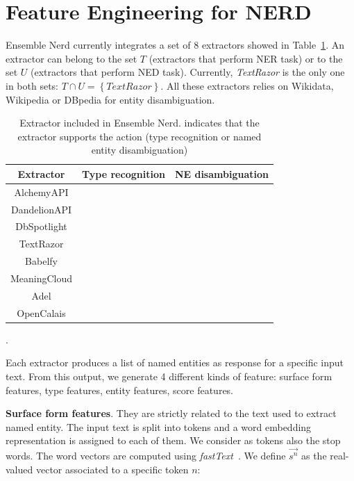 \documentclass{llncs}
\newcommand{\cmark}{\ding{51}}
\newcommand{\xmark}{\ding{55}}
\newcommand{\tabref}[1]{\mbox{Table~\ref{#1}}}
\begin{document}

\section{Feature Engineering for NERD}
\label{sec:study}
Ensemble Nerd currently integrates a set of 8 extractors showed in \tabref{tab:exout}. An extractor can belong to the set $T$ (extractors that perform NER task) or to the set $U$ (extractors that perform NED task). Currently, \textit{TextRazor} is the only one in both sets: $T \cap U = \left \{  TextRazor \right \}$. All these extractors relies on Wikidata, Wikipedia or DBpedia for entity disambiguation.
 
\begin{table}
\centering
\label{tab:exout}
\begin{tabular}{|c|c|c|}
\hline
\textbf{Extractor} & \textbf{Type recognition} & \textbf{NE disambiguation} \\ \hline
AlchemyAPI    & \cmark  & \xmark \\ \hline
DandelionAPI  & \xmark  & \cmark \\ \hline
DbSpotlight   & \xmark  & \cmark \\ \hline
TextRazor     & \cmark  & \cmark \\ \hline
Babelfy       & \xmark  & \cmark \\ \hline
MeaningCloud  & \cmark  & \xmark \\ \hline
Adel          & \cmark  & \xmark \\ \hline
OpenCalais    & \cmark  & \xmark \\ \hline
\end{tabular}
\bigskip
\caption{Extractor included in Ensemble Nerd. \cmark{ }indicates that the extractor supports the action (type recognition or named entity disambiguation)}.
\end{table}

Each extractor produces a list of named entities as response for a specific input text. From this output, we generate 4 different kinds of feature: surface form features, type features, entity features, score features.

\textbf{Surface form features}. They are strictly related to the text used to extract named entity. The input text is split into tokens and a word embedding representation is assigned to each of them. We consider as tokens also the stop words.
The word vectors are computed using \textit{fastText}~\cite{fasttext}. We define $\vec{s^{n}}$ as the real-valued vector associated to a specific token $n$:
\end{document}
